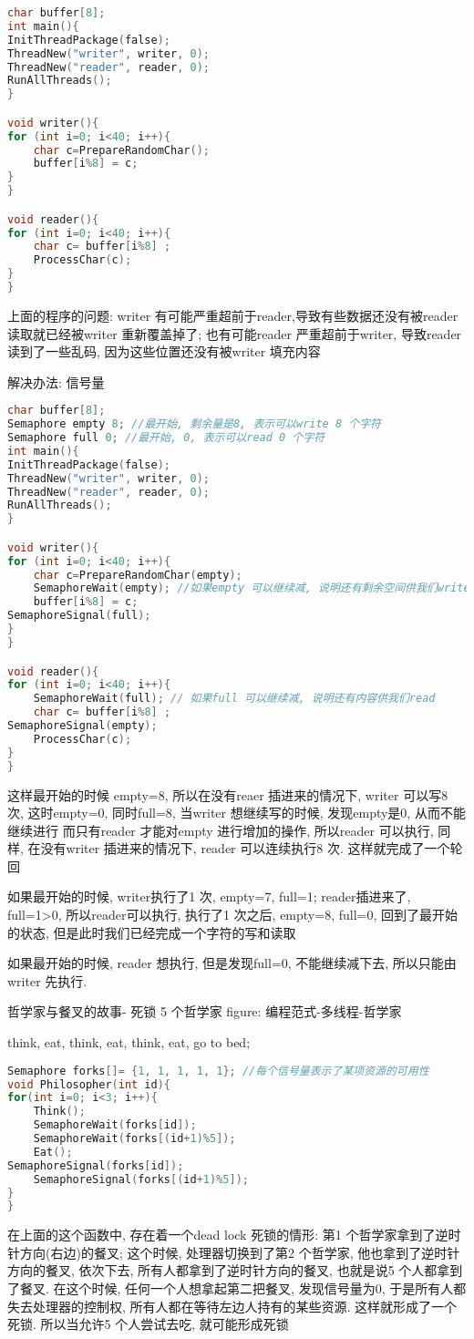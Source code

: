 \documentclass{article}
\begin{document}
\begin{lstlisting}[language = C]
char buffer[8];
int main(){
InitThreadPackage(false);
ThreadNew("writer", writer, 0);
ThreadNew("reader", reader, 0);
RunAllThreads();
}

void writer(){
for (int i=0; i<40; i++){
	char c=PrepareRandomChar();
	buffer[i%8] = c;
}
}

void reader(){
for (int i=0; i<40; i++){
	char c= buffer[i%8] ;
	ProcessChar(c);
}
}
\end{lstlisting}
上面的程序的问题: writer 有可能严重超前于reader,导致有些数据还没有被reader 读取就已经被writer 重新覆盖掉了; 也有可能reader 严重超前于writer, 导致reader 读到了一些乱码, 因为这些位置还没有被writer 填充内容

解决办法: 信号量

\begin{lstlisting}[language = C]
char buffer[8];
Semaphore empty 8; //最开始, 剩余量是8, 表示可以write 8 个字符
Semaphore full 0; //最开始, 0, 表示可以read 0 个字符
int main(){
InitThreadPackage(false);
ThreadNew("writer", writer, 0);
ThreadNew("reader", reader, 0);
RunAllThreads();
}

void writer(){
for (int i=0; i<40; i++){
	char c=PrepareRandomChar(empty);
	SemaphoreWait(empty); //如果empty 可以继续减, 说明还有剩余空间供我们write
	buffer[i%8] = c;
SemaphoreSignal(full);
}
}

void reader(){
for (int i=0; i<40; i++){
	SemaphoreWait(full); // 如果full 可以继续减, 说明还有内容供我们read
	char c= buffer[i%8] ;
SemaphoreSignal(empty);
	ProcessChar(c);
}
}
\end{lstlisting}
这样最开始的时候 empty=8, 所以在没有reaer 插进来的情况下, writer 可以写8 次, 这时empty=0, 同时full=8, 当writer 想继续写的时候, 发现empty是0, 从而不能继续进行
而只有reader 才能对empty 进行增加的操作, 所以reader 可以执行, 同样, 在没有writer 插进来的情况下, reader 可以连续执行8 次. 这样就完成了一个轮回

如果最开始的时候, writer执行了1 次, empty=7, full=1; reader插进来了, full=1>0, 所以reader可以执行, 执行了1 次之后, empty=8, full=0, 回到了最开始的状态, 但是此时我们已经完成一个字符的写和读取

如果最开始的时候, reader 想执行, 但是发现full=0, 不能继续减下去, 所以只能由writer 先执行.

哲学家与餐叉的故事- 死锁
5 个哲学家
figure: 编程范式-多线程-哲学家
 
think, eat, think, eat, think, eat, go to bed;
\begin{lstlisting}[language = C]
Semaphore forks[]= {1, 1, 1, 1, 1}; //每个信号量表示了某项资源的可用性
void Philosopher(int id){
for(int i=0; i<3; i++){
	Think();
	SemaphoreWait(forks[id]);
	SemaphoreWait(forks[(id+1)%5]);
	Eat();
SemaphoreSignal(forks[id]);
	SemaphoreSignal(forks[(id+1)%5]);
}
}
\end{lstlisting}
在上面的这个函数中, 存在着一个dead lock 死锁的情形:
第1 个哲学家拿到了逆时针方向(右边)的餐叉; 这个时候, 处理器切换到了第2 个哲学家, 他也拿到了逆时针方向的餐叉, 依次下去, 所有人都拿到了逆时针方向的餐叉, 也就是说5 个人都拿到了餐叉. 在这个时候, 任何一个人想拿起第二把餐叉, 发现信号量为0, 于是所有人都失去处理器的控制权, 所有人都在等待左边人持有的某些资源. 这样就形成了一个死锁.
所以当允许5 个人尝试去吃, 就可能形成死锁
\end{document}
